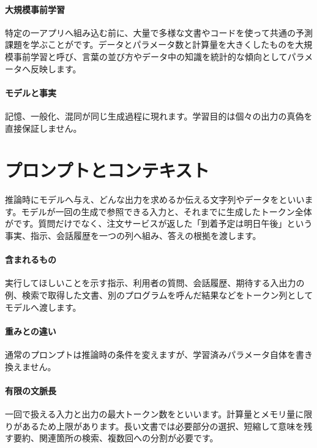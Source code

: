 \par
\endgroup
\medskip
\begingroup
\paragraph{大規模事前学習}
        特定の一アプリへ組み込む前に、大量で多様な文書やコードを使って共通の予測課題を学ぶことがです。データとパラメータ数と計算量を大きくしたものを大規模事前学習と呼び、言葉の並び方やデータ中の知識を統計的な傾向としてパラメータへ反映します。

\paragraph{モデルと事実}
        記憶、一般化、混同が同じ生成過程に現れます。学習目的は個々の出力の真偽を直接保証しません。

\par
\endgroup
\par
\endgroup


\section{プロンプトとコンテキスト}
\label{sec:06-machine-learning-29}

推論時にモデルへ与え、どんな出力を求めるか伝える文字列やデータをといいます。モデルが一回の生成で参照できる入力と、それまでに生成したトークン全体がです。質問だけでなく、注文サービスが返した「到着予定は明日午後」という事実、指示、会話履歴を一つの列へ組み、答えの根拠を渡します。

\begingroup
\begingroup
\paragraph{含まれるもの}
        実行してほしいことを示す指示、利用者の質問、会話履歴、期待する入出力の例、検索で取得した文書、別のプログラムを呼んだ結果などをトークン列としてモデルへ渡します。

\paragraph{重みとの違い}
        通常のプロンプトは推論時の条件を変えますが、学習済みパラメータ自体を書き換えません。

\par
\endgroup
\medskip
\begingroup
\paragraph{有限の文脈長}
        一回で扱える入力と出力の最大トークン数をといいます。計算量とメモリ量に限りがあるため上限があります。長い文書では必要部分の選択、短縮して意味を残す要約、関連箇所の検索、複数回への分割が必要です。

